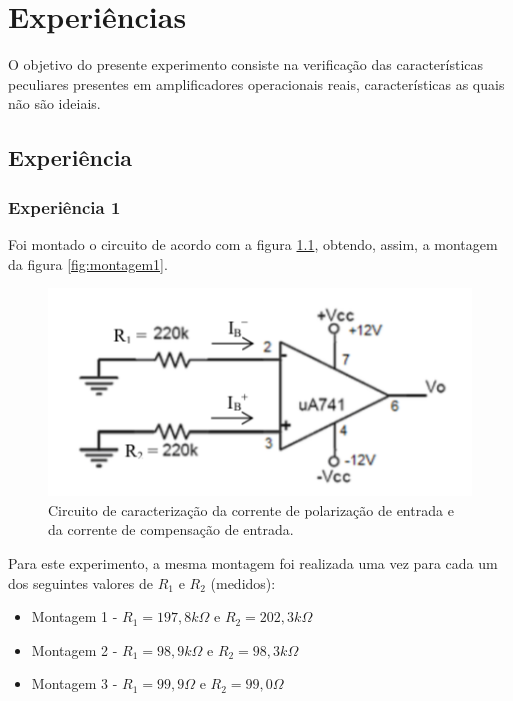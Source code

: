 \documentclass{abntex2}
\begin{document}
\imprimircapa
\imprimirfolhaderosto

\tableofcontents
\clearpage
\listoffigures
\clearpage

\chapter{Experiências}

 O objetivo do presente experimento consiste na verificação das características peculiares presentes
 em amplificadores operacionais reais, características as quais não são ideiais.

\section{Experiência}
\subsection{Experiência 1}

Foi montado o circuito de acordo com a figura \ref{fig:circuito1}, obtendo, assim, a montagem da figura \ref{fig:montagem1}.
\begin{figure}[h]
  \centering
  \includegraphics[scale = 0.5]{exp1.png}
  \caption{Circuito de caracterização da corrente de polarização de entrada e da corrente de compensação de entrada.}
  \label{fig:circuito1}
\end{figure}

Para este experimento, a mesma montagem foi realizada uma vez para cada um dos seguintes valores de $R_1$ e $R_2$ (medidos):
\begin{itemize}
  \item Montagem 1 - $R_1 = 197,8k\Omega$ e $R_2 = 202,3k\Omega$
  \item Montagem 2 - $R_1 = 98,9k\Omega$ e $R_2 = 98,3k\Omega$
  \item Montagem 3 - $R_1 = 99,9\Omega$ e $R_2 = 99,0\Omega$
\end{itemize}
\end{document}
